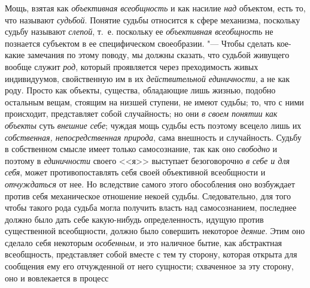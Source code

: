{{Мощь, взятая как
{\em объективная всеобщность}
и как насилие {\em над}
объектом, есть то, что называют
{\em судьбой}. Понятие
судьбы относится к сфере механизма, поскольку судьбу называют
{\em слепой}, т.~е.
поскольку ее {\em объективная
всеобщность} не познается субъектом в ее специфическом
своеобразии. "--- Чтобы сделать кое-какие замечания
по этому поводу, мы должны сказать, что судьбой живущего вообще служит
{\em род}, который
проявляется через преходимость живых индивидуумов, свойственную им в их
{\em действительной единичности},
а не как роду. Просто как объекты, существа, обладающие лишь
жизнью, подобно остальным вещам, стоящим на низшей ступени, не имеют
судьбы; то, что с ними происходит, представляет собой случайность; но они
{\em в своем понятии как объекты}
суть {\em внешние себе};
чуждая мощь судьбы есть поэтому всецело лишь их
{\em собственная, непосредственная
природа}, сама внешность и случайность. Судьбу в собственном
смысле имеет только самосознание, так как оно
{\em свободно} и поэтому
в {\em единичности}
своего <<я>> выступает безоговорочно
{\em в себе и для себя},
может противопоставлять себя своей объективной всеобщности и
{\em отчуждаться} от нее.
Но вследствие самого этого обособления оно возбуждает против
себя механическое отношение некоей судьбы. Следовательно, для того чтобы
такого рода судьба могла получить власть над самосознанием, последнее
должно было дать себе какую-нибудь определенность, идущую против
существенной всеобщности, должно было совершить некоторое
{\em деяние}. Этим оно
сделало себя некоторым {\em особенным},
и это наличное бытие, как абстрактная всеобщность,
представляет собой вместе с тем ту сторону, которая открыта для сообщения
ему его отчужденной от него сущности; схваченное за эту сторону, оно и
вовлекается в
процесс}}
